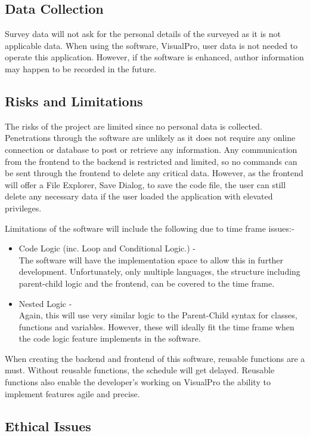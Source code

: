\documentclass[conference]{IEEEtran}
\begin{document}
      \subsection{Data Collection}
        Survey data will not ask for the personal details of the surveyed as it is not applicable data. When using the software, VisualPro, user data is not needed to operate this application. However, if the software is enhanced, author information may happen to be recorded in the future.

      \subsection{Risks and Limitations}
        The risks of the project are limited since no personal data is collected. Penetrations through the software are unlikely as it does not require any online connection or database to post or retrieve any information. Any communication from the frontend to the backend is restricted and limited, so no commands can be sent through the frontend to delete any critical data. However, as the frontend will offer a File Explorer, Save Dialog, to save the code file, the user can still delete any necessary data if the user loaded the application with elevated privileges.

        Limitations of the software will include the following due to time frame issues:-
        \begin{itemize}
          \item Code Logic (inc. Loop and Conditional Logic.) -\\
            The software will have the implementation space to allow this in further development. Unfortunately, only multiple languages, the structure including parent-child logic and the frontend, can be covered to the time frame.
          \item Nested Logic -\\
            Again, this will use very similar logic to the Parent-Child syntax for classes, functions and variables. However, these will ideally fit the time frame when the code logic feature implements in the   software.
        \end{itemize}
        When creating the backend and frontend of this software, reusable functions are a must. Without reusable functions, the schedule will get delayed. Reusable functions also enable the developer's working on VisualPro the ability to implement features agile and precise. 
        
      \subsection{Ethical Issues}
        
\end{document}
